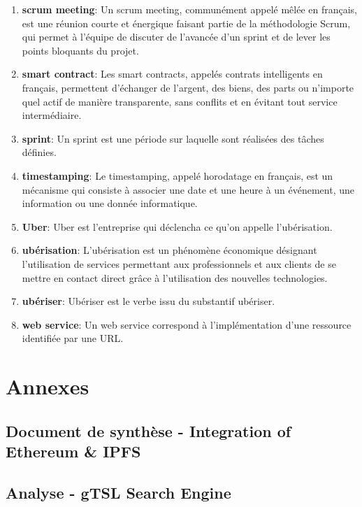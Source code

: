\documentclass{tnreport}
\begin{document}
\begin{enumerate}
	\item \textbf{scrum meeting}: Un scrum meeting, communément appelé mêlée en français, est une réunion courte et énergique faisant partie de la méthodologie Scrum, qui permet à l'équipe de discuter de l'avancée d'un sprint et de lever les points bloquants du projet.
	\item \textbf{smart contract}: Les smart contracts, appelés contrats intelligents en français, permettent d'échanger de l'argent, des biens, des parts ou n'importe quel actif de manière transparente, sans conflits et en évitant tout service intermédiaire.
	\item \textbf{sprint}: Un sprint est une période sur laquelle sont réalisées des tâches définies.
	\item \textbf{timestamping}: Le timestamping, appelé horodatage en français, est un mécanisme qui consiste à associer une date et une heure à un événement, une information ou une donnée informatique.
	\item \textbf{Uber}: Uber est l'entreprise qui déclencha ce qu'on appelle l'ubérisation.
	\item \textbf{ubérisation}: L'ubérisation est un phénomène économique désignant l'utilisation de services permettant aux professionnels et aux clients de se mettre en contact direct grâce à l'utilisation des nouvelles technologies.
	\item \textbf{ubériser}: Ubériser est le verbe issu du substantif ubériser.
	\item \textbf{web service}: Un web service correspond à l'implémentation d'une ressource identifiée par une URL.
\end{enumerate}

\cleardoublepage
\renewcommand{\thesubsection}{\Roman{subsection}}

\appendix
\part*{Annexes}
\clearpage

\chapter{Document de synthèse - Integration of Ethereum \& IPFS}
\label{anx:ipfs-ethereum}

\clearpage

\chapter{Analyse - gTSL Search Engine}
\label{anx:gtsl-search-engine}

\clearpage
\end{document}
